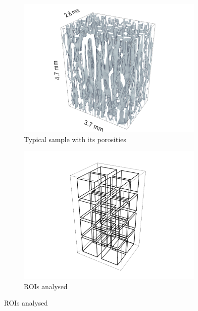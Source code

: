 \documentclass[a4paper,fleqn]{DC_ArtStyle}
\begin{document}
	\begin{figure}[!h]
		\centering
		\begin{subfigure}[t]{.45\linewidth}
			\includegraphics[height=0.8\linewidth]{Scan}
			\caption{Typical sample with its porosities}
		\end{subfigure}
		\begin{subfigure}[t]{0.45\linewidth}
			\includegraphics[height=0.8\linewidth, trim=50 50 50 0]{ROIs}
			\caption{ROIs analysed}
		\end{subfigure}
	\end{figure}
\end{document}
